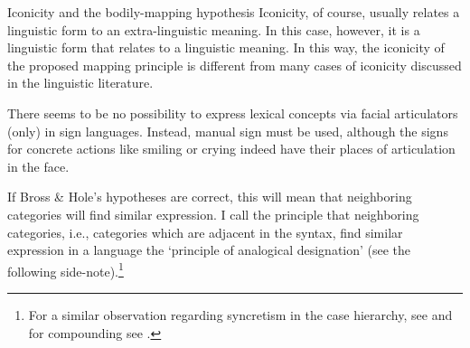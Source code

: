 \begin{digression}{Iconicity and the bodily-mapping hypothesis}{}
Iconicity, of course, usually relates a linguistic form to an extra-linguistic meaning. In this case, however, it is a linguistic form that relates to a linguistic meaning. In this way, the iconicity of the proposed mapping principle is different from many cases of iconicity discussed in the linguistic literature.




\end{digression}

\noindent There seems to be no possibility to express lexical concepts via facial articulators (only) in sign languages. Instead, manual sign must be used, although the signs for concrete actions like smiling or crying indeed have their places of articulation in the face. 

If Bross \& Hole's hypotheses are correct, this will mean that neighboring categories will find similar expression. I call the principle that neighboring categories, i.e., categories which are adjacent in the syntax, find similar expression in a language the `principle of analogical designation' (see the following side-note).\footnote{ For a similar observation regarding syncretism in the case hierarchy, see \citet{caha2009nanosyntax} and for compounding see \citet{hole2015arguments}.}

